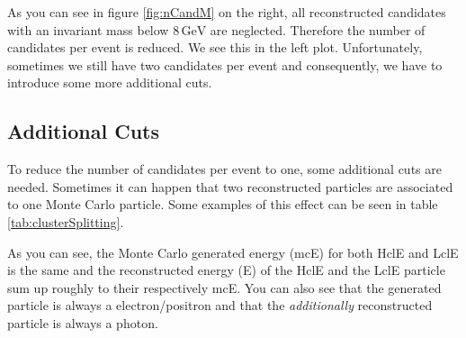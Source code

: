 \documentclass[a4paper,11pt,twosided,final,german,openbib,pdftex,listof=totoc,bibliography=totoc]{scrbook}
\begin{document}
As you can see in figure \ref{fig:nCandM} on the right, all reconstructed candidates with an invariant mass below $8\,\textrm{GeV}$ are neglected. Therefore the number of candidates per event is reduced. We see this in the left plot. Unfortunately, sometimes we still have two candidates per event and consequently, we have to introduce some more additional cuts.



\subsection{Additional Cuts}

To reduce the number of candidates per event to one, some additional cuts are needed. Sometimes it can happen that two reconstructed particles are associated to one Monte Carlo particle. Some examples of this effect can be seen in table \ref{tab:clusterSplitting}. 


\begin{table}[h!]
	\centering
	\caption[Cluster Splitting Examples]{Some examples for events with cluster splitting. The energies are in GeV.}
	\label{tab:clusterSplitting}
\end{table}




As you can see, the Monte Carlo generated energy (mcE) for both HclE and LclE is the same and the reconstructed energy (E) of the HclE and the LclE particle sum up roughly to their respectively mcE. You can also see that the generated particle is always a electron/positron and that the \textit{additionally} reconstructed particle is always a photon.
\end{document}
